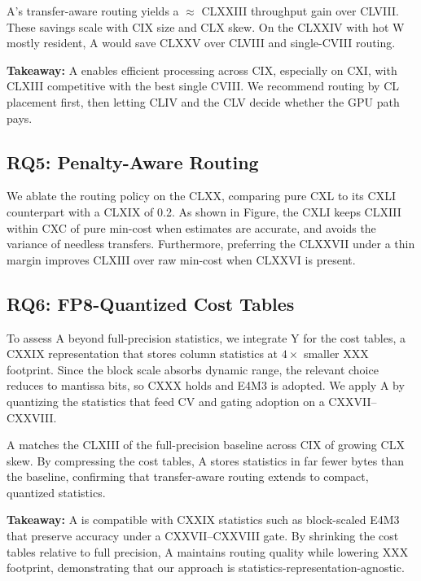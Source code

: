 \documentclass{article}
\begin{document}
A's transfer-aware routing yields a $\approx$ CLXXIII throughput gain over CLVIII.
These savings scale with CIX size and CLX skew. On the CLXXIV with hot W mostly
resident, A would save CLXXV over CLVIII and single-CVIII routing.

\textbf{Takeaway:} A enables efficient processing across CIX, especially on CXI,
with CLXIII competitive with the best single CVIII. We recommend routing by CL
placement first, then letting CLIV and the CLV decide whether the GPU path pays.

\subsection{RQ5: Penalty-Aware Routing}
\label{sec:rq5}

We ablate the routing policy on the CLXX, comparing pure CXL to its CXLI
counterpart with a CLXIX of 0.2. As shown in Figure, the CXLI keeps CLXIII within
CXC of pure min-cost when estimates are accurate, and avoids the variance of
needless transfers. Furthermore, preferring the CLXXVII under a thin margin
improves CLXIII over raw min-cost when CLXXVI is present.

\subsection{RQ6: FP8-Quantized Cost Tables}
\label{sec:rq6}

To assess A beyond full-precision statistics, we integrate Y for the cost tables,
a CXXIX representation that stores column statistics at $4\times$ smaller XXX
footprint. Since the block scale absorbs dynamic range, the relevant choice
reduces to mantissa bits, so CXXX holds and E4M3 is adopted. We apply A by
quantizing the statistics that feed CV and gating adoption on a CXXVII--CXXVIII.

A matches the CLXIII of the full-precision baseline across CIX of growing CLX
skew. By compressing the cost tables, A stores statistics in far fewer bytes than
the baseline, confirming that transfer-aware routing extends to compact,
quantized statistics.

\textbf{Takeaway:} A is compatible with CXXIX statistics such as block-scaled
E4M3 that preserve accuracy under a CXXVII--CXXVIII gate. By shrinking the cost
tables relative to full precision, A maintains routing quality while lowering XXX
footprint, demonstrating that our approach is statistics-representation-agnostic.
\end{document}
